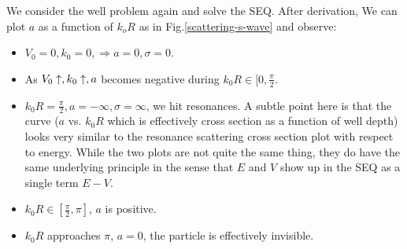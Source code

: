 \documentclass{school-22.101-notes}
\begin{document}
We consider the well problem again and solve the SEQ. After derivation,  
We can plot $a$ as a function of $k_o R$ as in Fig.\ref{scattering-s-wave} and observe:
\begin{itemize}
\item $V_0 = 0, k_0 = 0, \Rightarrow a= 0 ,\sigma = 0$. 
\item As $V_0 \uparrow, k_0 \uparrow, a$ becomes negative during $k_0 R \in [0, \frac{\pi}{2}$. 
\item $k_0 R = \frac{\pi}{2}, a = -\infty, \sigma = \infty$, we hit resonances. A subtle point here is that the curve ($a$ vs. $k_0 R$ which is effectively cross section as a function of well depth) looks very similar to the resonance scattering cross section plot with respect to energy. While the two plots are not quite the same thing, they do have the same underlying principle in the sense that $E$ and $V$ show up in the SEQ as a single term $E-V$.  
\item $k_0 R \in [\frac{\pi}{2}, \pi]$, $a$ is positive. 
\item $k_0 R$ approaches $\pi$, $a = 0$, the particle is effectively invisible. 
\end{itemize}
\end{document}

